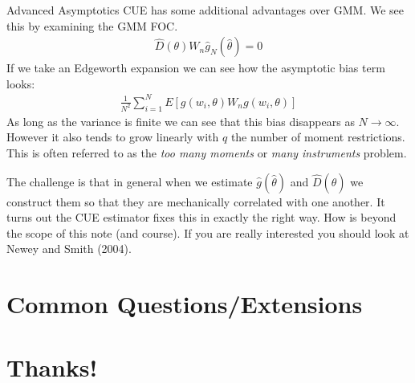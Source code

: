 \documentclass[aspectratio=169]{beamer}
\begin{document}
\begin{frame}{Advanced Asymptotics}
\small
CUE has some additional advantages over GMM. We see this by examining the GMM FOC. 
\begin{eqnarray*}
\hat{D}(\theta) W_n \hat{g}_N(\hat{\theta}) =0
\end{eqnarray*}
If we take an Edgeworth expansion we can see how the  \alert{asymptotic bias} term looks:
\begin{eqnarray*}
\frac{1}{N^2}\sum_{i=1}^N E[g(w_i,\theta) W_n g(w_i,\theta)]
\end{eqnarray*}
As long as the variance is finite we can see that this bias disappears as $N \rightarrow \infty$. However it also tends to grow linearly with $q$ the number of moment restrictions. This is often referred to as the \textit{too many moments} or \textit{many instruments} problem.

The challenge is that in general when we estimate $\hat{g}(\hat{\theta})$ and $\hat{D}(\hat{\theta})$ we construct them so that they are mechanically correlated with one another. It turns out the CUE estimator fixes this in exactly the right way. How is beyond the scope of this note (and course). If you are really interested you should look at Newey and Smith (2004).

\end{frame}
\section*{\normalsize  Common Questions/Extensions}

\section*{Thanks!}
\end{document}
